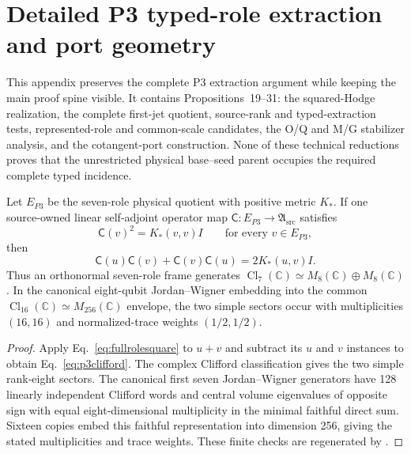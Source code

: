 \section{Detailed P3 typed-role extraction and port geometry}
\label{app:p3technical}

This appendix preserves the complete P3 extraction argument while keeping the
main proof spine visible.  It contains Propositions~19--31: the squared-Hodge
realization, the complete first-jet quotient, source-rank and typed-extraction
tests, represented-role and common-scale candidates, the O/Q and M/G
stabilizer analysis, and the cotangent-port construction.  None of these
technical reductions proves that the unrestricted physical base--seed parent
occupies the required complete typed incidence.

\begin{proposition}
\label{prop:p3clifford}
Let $E_{P3}$ be the seven-role physical quotient with positive metric $K_*$.
If one source-owned linear self-adjoint operator map
$\mathsf C:E_{P3}\to\mathfrak A_{\mathrm{src}}$ satisfies
\begin{equation}
\mathsf C(v)^2=K_*(v,v)I
\qquad\text{for every }v\in E_{P3},
\label{eq:fullrolesquare}
\end{equation}
then
\begin{equation}
\mathsf C(u)\mathsf C(v)+\mathsf C(v)\mathsf C(u)
=2K_*(u,v)I.
\label{eq:p3clifford}
\end{equation}
Thus an orthonormal seven-role frame generates
$\operatorname{Cl}_7(\mathbb C)\simeq
M_8(\mathbb C)\oplus M_8(\mathbb C)$.  In the canonical eight-qubit
Jordan--Wigner embedding into the common
$\operatorname{Cl}_{16}(\mathbb C)\simeq M_{256}(\mathbb C)$ envelope, the
two simple sectors occur with multiplicities $(16,16)$ and normalized-trace
weights $(1/2,1/2)$.
\end{proposition}

\begin{proof}
Apply Eq.~\eqref{eq:fullrolesquare} to $u+v$ and subtract its $u$ and $v$
instances to obtain Eq.~\eqref{eq:p3clifford}.  The complex Clifford
classification gives the two simple rank-eight sectors.  The canonical first
seven Jordan--Wigner generators have 128 linearly independent Clifford words
and central volume eigenvalues of opposite sign with equal eight-dimensional
multiplicity in the minimal faithful direct sum.  Sixteen copies embed this
faithful representation into dimension 256, giving the stated multiplicities
and trace weights.  These finite checks are regenerated by
.
\end{proof}

